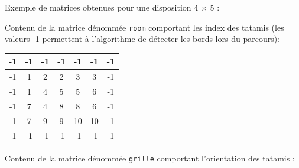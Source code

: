 Exemple de matrices obtenues pour une disposition 4 $\times$ 5 :

\setlength{\columnseprule}{1pt}
\setlength{\columnsep}{1cm}
\begin{multicols}{2}

    Contenu de la matrice dénommée \texttt{room} comportant les index des tatamis (les valeurs -1 permettent à l’algorithme de détecter les bords lors du parcours):

    \begin{center}
        \begin{tabular}{|c |c |c |c |c |c |c |} \hline
            -1 & -1                    & -1                         & -1                         & -1                          & -1                          & -1 \\ \hline
            -1 & \cellcolor{tsyellow}1 & \cellcolor{tsforestgreen}2 & \cellcolor{tsforestgreen}2 & \cellcolor{tsforestgreen}3  & \cellcolor{tsforestgreen}3  & -1 \\ \hline
            -1 & \cellcolor{tsyellow}1 & \cellcolor{tsyellow}4      & \cellcolor{tsforestgreen}5 & \cellcolor{tsforestgreen}5  & \cellcolor{tsyellow}6       & -1 \\ \hline
            -1 & \cellcolor{tsyellow}7 & \cellcolor{tsyellow}4      & \cellcolor{tsforestgreen}8 & \cellcolor{tsforestgreen}8  & \cellcolor{tsyellow}6       & -1 \\ \hline
            -1 & \cellcolor{tsyellow}7 & \cellcolor{tsforestgreen}9 & \cellcolor{tsforestgreen}9 & \cellcolor{tsforestgreen}10 & \cellcolor{tsforestgreen}10 & -1 \\ \hline
            -1 & -1                    & -1                         & -1                         & -1                          & -1                          & -1 \\ \hline
        \end{tabular}

    \end{center}

    \columnbreak

    Contenu de la matrice dénommée \texttt{grille} comportant l’orientation des tatamis :

    \begin{center}


\end{center}
\end{multicols}
